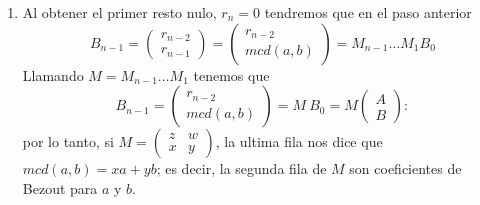\documentclass{report}
\begin{document}
\begin{enumerate}
	\item Al obtener el primer resto nulo, $r_n=0$ tendremos que en el paso anterior $$B_{n-1}=\begin{pmatrix} r_{n-2}\\r_{n-1} \end{pmatrix}=\begin{pmatrix} r_{n-2}\\mcd(a,b) \end{pmatrix}=M_{n-1}\dots M_1B_0$$
	      Llamando $M=M_{n-1}\dots M_1$ tenemos que $$B_{n-1}=\begin{pmatrix} r_{n-2}\\mcd(a,b) \end{pmatrix}=M\ B_0=M\begin{pmatrix} A \\ B \end{pmatrix}:$$
	      por lo tanto, si $M=\begin{pmatrix} z & w \\ x & y \end{pmatrix} $, la ultima fila nos dice que $mcd(a,b)=xa+yb$; es decir, la segunda fila de $M$ son coeficientes de Bezout para $a$ y $b$.
\end{enumerate}
\end{document}

